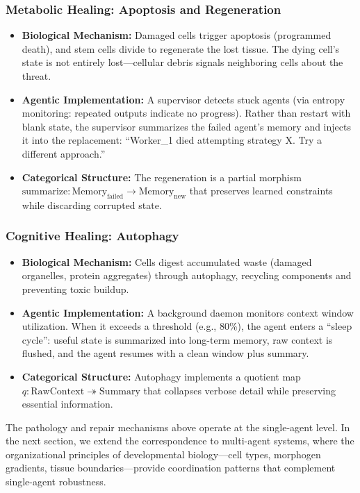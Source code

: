 \subsubsection{Metabolic Healing: Apoptosis and Regeneration}

\begin{itemize}[leftmargin=*]
\item \textbf{Biological Mechanism:} Damaged cells trigger apoptosis (programmed death), and stem
cells divide to regenerate the lost tissue. The dying cell's state is not entirely lost---cellular
debris signals neighboring cells about the threat.
\item \textbf{Agentic Implementation:} A supervisor detects stuck agents (via entropy monitoring:
repeated outputs indicate no progress). Rather than restart with blank state, the supervisor
summarizes the failed agent's memory and injects it into the replacement: ``Worker\_1 died
attempting strategy X. Try a different approach.''
\item \textbf{Categorical Structure:} The regeneration is a partial morphism
$\text{summarize}: \text{Memory}_{\text{failed}} \to \text{Memory}_{\text{new}}$ that preserves
learned constraints while discarding corrupted state.
\end{itemize}

\subsubsection{Cognitive Healing: Autophagy}

\begin{itemize}[leftmargin=*]
\item \textbf{Biological Mechanism:} Cells digest accumulated waste (damaged organelles, protein
aggregates) through autophagy, recycling components and preventing toxic buildup.
\item \textbf{Agentic Implementation:} A background daemon monitors context window utilization.
When it exceeds a threshold (e.g., 80\%), the agent enters a ``sleep cycle'': useful state is
summarized into long-term memory, raw context is flushed, and the agent resumes with a clean
window plus summary.
\item \textbf{Categorical Structure:} Autophagy implements a quotient map
$q: \text{RawContext} \twoheadrightarrow \text{Summary}$ that collapses verbose detail while
preserving essential information.
\end{itemize}

The pathology and repair mechanisms above operate at the single-agent level. In the next section, we extend the correspondence to multi-agent systems, where the organizational principles of developmental biology---cell types, morphogen gradients, tissue boundaries---provide coordination patterns that complement single-agent robustness.
